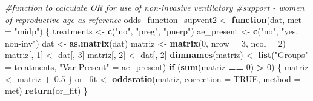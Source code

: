 \documentclass[
]{article}
\newenvironment{Shaded}{\begin{snugshade}}{\end{snugshade}}
\newcommand{\CommentTok}[1]{\textcolor[rgb]{0.56,0.35,0.01}{\textit{#1}}}
\newcommand{\ControlFlowTok}[1]{\textcolor[rgb]{0.13,0.29,0.53}{\textbf{#1}}}
\newcommand{\DataTypeTok}[1]{\textcolor[rgb]{0.13,0.29,0.53}{#1}}
\newcommand{\DecValTok}[1]{\textcolor[rgb]{0.00,0.00,0.81}{#1}}
\newcommand{\FloatTok}[1]{\textcolor[rgb]{0.00,0.00,0.81}{#1}}
\newcommand{\KeywordTok}[1]{\textcolor[rgb]{0.13,0.29,0.53}{\textbf{#1}}}
\newcommand{\NormalTok}[1]{#1}
\newcommand{\OperatorTok}[1]{\textcolor[rgb]{0.81,0.36,0.00}{\textbf{#1}}}
\newcommand{\OtherTok}[1]{\textcolor[rgb]{0.56,0.35,0.01}{#1}}
\newcommand{\StringTok}[1]{\textcolor[rgb]{0.31,0.60,0.02}{#1}}
\begin{document}
\begin{Shaded}
\begin{Highlighting}[]
\CommentTok{#function to calculate OR for use of non-invasive ventilatory}
\CommentTok{#support - women of reproductive age as reference}
\NormalTok{odds_function_supvent2 <-}\StringTok{ }\ControlFlowTok{function}\NormalTok{(dat, }\DataTypeTok{met =} \StringTok{"midp"}\NormalTok{) \{}
\NormalTok{  treatments <-}\StringTok{ }\KeywordTok{c}\NormalTok{(}\StringTok{"no"}\NormalTok{, }\StringTok{"preg"}\NormalTok{, }\StringTok{"puerp"}\NormalTok{)}
\NormalTok{  ae_present <-}\StringTok{ }\KeywordTok{c}\NormalTok{(}\StringTok{"no"}\NormalTok{, }\StringTok{"yes, non-inv"}\NormalTok{)}
\NormalTok{  dat <-}\StringTok{ }\KeywordTok{as.matrix}\NormalTok{(dat)}
\NormalTok{  matriz <-}\StringTok{ }\KeywordTok{matrix}\NormalTok{(}\DecValTok{0}\NormalTok{, }\DataTypeTok{nrow =} \DecValTok{3}\NormalTok{, }\DataTypeTok{ncol =} \DecValTok{2}\NormalTok{)}
\NormalTok{  matriz[, }\DecValTok{1}\NormalTok{] <-}\StringTok{ }\NormalTok{dat[, }\DecValTok{3}\NormalTok{]}
\NormalTok{  matriz[, }\DecValTok{2}\NormalTok{] <-}\StringTok{ }\NormalTok{dat[, }\DecValTok{2}\NormalTok{]}
  \KeywordTok{dimnames}\NormalTok{(matriz) <-}\StringTok{ }\KeywordTok{list}\NormalTok{(}\StringTok{"Groups"}\NormalTok{ =}\StringTok{ }\NormalTok{treatments,}
                           \StringTok{"Var Present"}\NormalTok{ =}\StringTok{ }\NormalTok{ae_present)}
  \ControlFlowTok{if}\NormalTok{ (}\KeywordTok{sum}\NormalTok{(matriz }\OperatorTok{==}\StringTok{ }\DecValTok{0}\NormalTok{) }\OperatorTok{>}\StringTok{ }\DecValTok{0}\NormalTok{) \{}
\NormalTok{    matriz <-}\StringTok{ }\NormalTok{matriz }\OperatorTok{+}\StringTok{ }\FloatTok{0.5}
\NormalTok{  \}}
\NormalTok{  or_fit <-}\StringTok{ }\KeywordTok{oddsratio}\NormalTok{(matriz, }\DataTypeTok{correction =} \OtherTok{TRUE}\NormalTok{, }\DataTypeTok{method =}\NormalTok{ met)}
  \KeywordTok{return}\NormalTok{(or_fit)}
\NormalTok{\}}


\end{Highlighting}
\end{Shaded}
\end{document}
